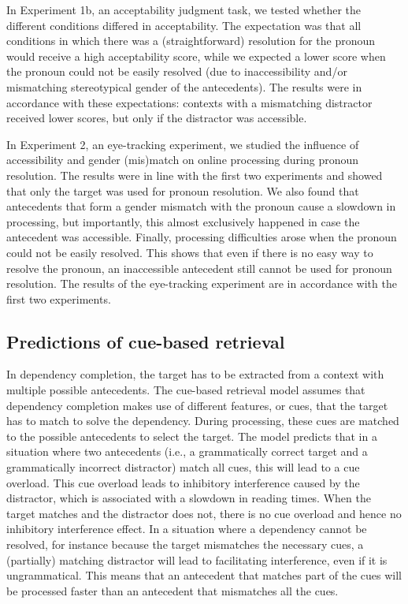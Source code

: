\documentclass[11pt]{article} %
\begin{document}
In Experiment 1b, an acceptability judgment task, we tested whether the different conditions differed in acceptability. The expectation was that all conditions in which there was a (straightforward) resolution for the pronoun would receive a high acceptability score, while we expected a lower score when the pronoun could not be easily resolved (due to inaccessibility and/or mismatching stereotypical gender of the antecedents). The results were in accordance with these expectations: contexts with a mismatching distractor received lower scores, but only if the distractor was accessible. 

In Experiment 2, an eye-tracking experiment, we studied the influence of accessibility and gender (mis)match on online processing during pronoun resolution. The results were in line with the first two experiments and showed that only the target was used for pronoun resolution. We also found that antecedents that form a gender mismatch with the pronoun cause a slowdown in processing, but importantly, this almost exclusively happened in case the antecedent was accessible. Finally, processing difficulties arose when the pronoun could not be easily resolved. This shows that even if there is no easy way to resolve the pronoun, an inaccessible antecedent still cannot be used for pronoun resolution. The results of the eye-tracking experiment are in accordance with the first two experiments.


\subsection{Predictions of cue-based retrieval}
In dependency completion, the target has to be extracted from a context with multiple possible antecedents. The cue-based retrieval model assumes that dependency completion makes use of different features, or cues, that the target has to match to solve the dependency. During processing, these cues are matched to the possible antecedents to select the target. The model predicts that in a situation where two antecedents (i.e., a grammatically correct target and a grammatically incorrect distractor) match all cues, this will lead to a cue overload. This cue overload leads to inhibitory interference caused by the distractor, which is associated with a slowdown in reading times. When the target matches and the distractor does not, there is no cue overload and hence no inhibitory interference effect. In a situation where a dependency cannot be resolved, for instance because the target mismatches the necessary cues, a (partially) matching distractor will lead to facilitating interference, even if it is ungrammatical. This means that an antecedent that matches part of the cues will be processed faster than an antecedent that mismatches all the cues. 
\end{document}
